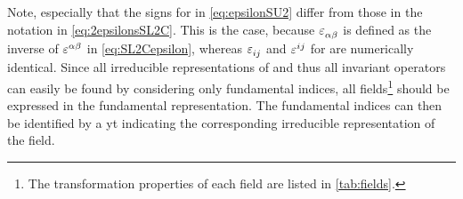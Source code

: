 Note, especially that the signs for  in \cref{eq:epsilonSU2} differ from those in the \SLtwoC{} notation in \cref{eq:2epsilonsSL2C}. This is the case, because $ \tensor{\eps}{_{\alpha \beta}} $ is defined as the inverse of $ \tensor{\eps}{^{\alpha \beta}} $ in \cref{eq:SL2Cepsilon}, whereas $ \tensor{\eps}{_{i j}} $ and $ \tensor{\eps}{^{i j}} $ for  are numerically identical.
%
Since all irreducible representations of  and thus all invariant operators can easily be found by considering only fundamental indices, all fields\footnote{The transformation properties of each field are listed in \cref{tab:fields}.} should be expressed in the fundamental representation.
The fundamental indices can then be identified by a \gls{yt} indicating the corresponding irreducible representation of the field. \par
%
